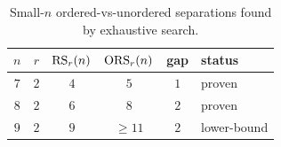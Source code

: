 \begin{table}[t]\centering\small
\begin{tabular}{@{}cccccl@{}}
\toprule
$n$ & $r$ & $\mathrm{RS}_r(n)$ & $\mathrm{ORS}_r(n)$ & gap & status \\
\midrule
$7$ & $2$ & $4$ & $5$ & $1$ & \textsf{proven} \\
$8$ & $2$ & $6$ & $8$ & $2$ & \textsf{proven} \\
$9$ & $2$ & $9$ & $\ge 11$ & $2$ & \textsf{lower-bound} \\
\bottomrule
\end{tabular}
\caption{Small-$n$ ordered-vs-unordered separations found by exhaustive search.}
\label{tab:sep}
\end{table}
